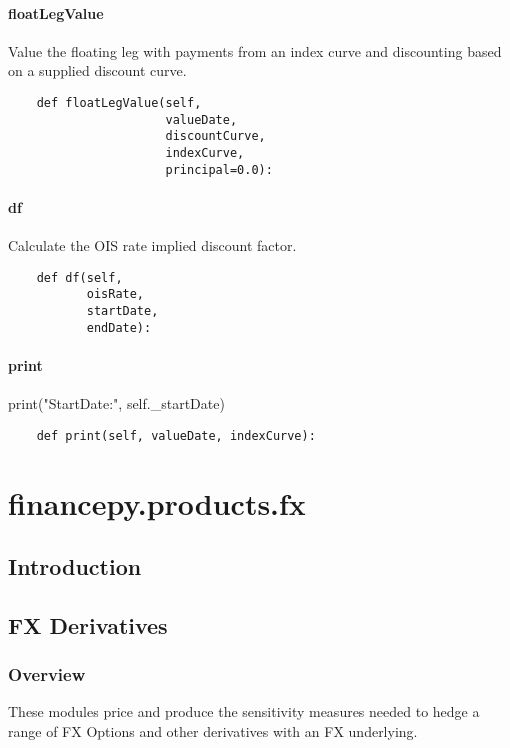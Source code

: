\documentclass[twoside,11pt]{book}
\begin{document}
\subsubsection*{{\bf floatLegValue}}
Value the floating leg with payments from an index curve and discounting based on a supplied discount curve.  

\begin{lstlisting}
    def floatLegValue(self,
                      valueDate,
                      discountCurve,
                      indexCurve,
                      principal=0.0):
\end{lstlisting}

\subsubsection*{{\bf df}}
Calculate the OIS rate implied discount factor.  

\begin{lstlisting}
    def df(self,
           oisRate,
           startDate,
           endDate):
\end{lstlisting}

\subsubsection*{{\bf print}}
print("StartDate:", self.\_startDate) 

\begin{lstlisting}
    def print(self, valueDate, indexCurve):
\end{lstlisting}


\chapter{financepy.products.fx}
\section{Introduction}


\section*{FX Derivatives}

\subsection*{Overview}
These modules price and produce the sensitivity measures needed to hedge a range of FX Options and other derivatives with an FX underlying.
\end{document}
